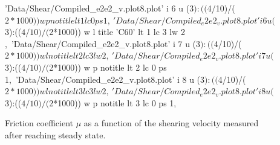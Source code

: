 \documentclass[aps,prb,reprint,superscriptaddress, a4paper]{revtex4-1}
\begin{document}
\begin{figure}
\begin{center}
\begin{gnuplot}[terminal=pdf, terminaloptions={size \SERFigwidth cm, \SERFigheight cm color solid}]
				        'Data/Shear/Compiled_e2e2_v.plot8.plot' i 6 u ($3):(($4/10)/($2*1000)) w p notitle lt 1 lc 0 ps 1 ,\
        				'Data/Shear/Compiled_e2e2_v.plot8.plot' i 6 u ($3):(($4/10)/($2*1000)) w l title 'C60' lt 1 lc 3 lw 2 ,\				
		        		'Data/Shear/Compiled_e2e2_v.plot8.plot' i 7 u ($3):(($4/10)/($2*1000)) w l notitle  lt 2 lc 3 lw 2 ,\
				        'Data/Shear/Compiled_e2e2_v.plot8.plot' i 7 u ($3):(($4/10)/($2*1000)) w p notitle  lt 2 lc 0 ps 1,\
        	   			'Data/Shear/Compiled_e2e2_v.plot8.plot' i 8 u ($3):(($4/10)/($2*1000)) w l notitle  lt 3 lc 3 lw 2 ,\
			        	'Data/Shear/Compiled_e2e2_v.plot8.plot' i 8 u ($3):(($4/10)/($2*1000)) w p notitle  lt 3 lc 0 ps 1,\
		\end{gnuplot}
		\caption{Friction coefficient $\mu$ as a function of the shearing velocity measured after reaching steady state.}
		\label{fig:FL_v}
	\end{center}
 \end{figure}
\end{document}
